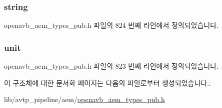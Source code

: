 \subsubsection[{\texorpdfstring{string}{string}}]{ string}\hypertarget{structopenavb__aem__control__value__format__control__linear__uint32__t_a1f81001cefa769cb3651172fd5ab0748}{}\label{structopenavb__aem__control__value__format__control__linear__uint32__t_a1f81001cefa769cb3651172fd5ab0748}


openavb\+\_\+aem\+\_\+types\+\_\+pub.\+h 파일의 824 번째 라인에서 정의되었습니다.

\subsubsection[{\texorpdfstring{unit}{unit}}]{ unit}\hypertarget{structopenavb__aem__control__value__format__control__linear__uint32__t_a0b3ff376c10369016824076deacc055e}{}\label{structopenavb__aem__control__value__format__control__linear__uint32__t_a0b3ff376c10369016824076deacc055e}


openavb\+\_\+aem\+\_\+types\+\_\+pub.\+h 파일의 823 번째 라인에서 정의되었습니다.



이 구조체에 대한 문서화 페이지는 다음의 파일로부터 생성되었습니다.\+:\begin{DoxyCompactItemize}
\item 
lib/avtp\+\_\+pipeline/aem/\hyperlink{openavb__aem__types__pub_8h}{openavb\+\_\+aem\+\_\+types\+\_\+pub.\+h}\end{DoxyCompactItemize}
